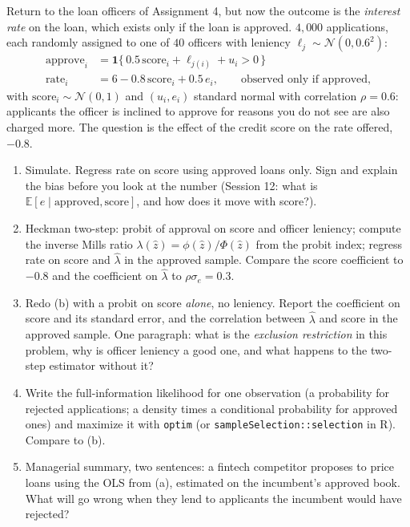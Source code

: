 \documentclass[11pt]{article}
\newcommand{\E}{\mathbb{E}}
\begin{document}
Return to the loan officers of Assignment 4, but now the outcome is the \emph{interest rate} on the
loan, which exists only if the loan is approved. $4{,}000$ applications, each randomly assigned to
one of $40$ officers with leniency $\ell_{j} \sim \mathcal{N}(0, 0.6^{2})$:
\begin{align*}
\text{approve}_{i} &= \mathbf{1}\{\,0.5\,\text{score}_{i} + \ell_{j(i)} + u_{i} > 0\,\} \\
\text{rate}_{i} &= 6 - 0.8\,\text{score}_{i} + 0.5\,e_{i}, \qquad \text{observed only if approved,}
\end{align*}
with $\text{score}_{i} \sim \mathcal{N}(0,1)$ and $(u_{i}, e_{i})$ standard normal with correlation
$\rho = 0.6$: applicants the officer is inclined to approve for reasons you do not see are also
charged more. The question is the effect of the credit score on the rate offered, $-0.8$.

\begin{enumerate}[label=(\alph*)]
\item Simulate. Regress rate on score using approved loans only. Sign and explain the bias before
you look at the number (Session 12: what is $\E[e \mid \text{approved}, \text{score}]$, and how does it
move with score?).
\item Heckman two-step: probit of approval on score and officer leniency; compute the inverse
Mills ratio $\lambda(\hat z) = \phi(\hat z)/\Phi(\hat z)$ from the probit index; regress rate on
score and $\hat\lambda$ in the approved sample. Compare the score coefficient to $-0.8$ and the
coefficient on $\hat\lambda$ to $\rho\sigma_{e} = 0.3$.
\item Redo (b) with a probit on score \emph{alone}, no leniency. Report the coefficient on score and
its standard error, and the correlation between $\hat\lambda$ and score in the approved sample.
One paragraph: what is the \emph{exclusion restriction} in this problem, why is officer leniency a
good one, and what happens to the two-step estimator without it?
\item Write the full-information likelihood for one observation (a probability for rejected
applications; a density times a conditional probability for approved ones) and maximize it with
\texttt{optim} (or \texttt{sampleSelection::selection} in R). Compare to (b).
\item Managerial summary, two sentences: a fintech competitor proposes to price loans using the
OLS from (a), estimated on the incumbent's approved book. What will go wrong when they lend to
applicants the incumbent would have rejected?
\end{enumerate}
\end{document}
